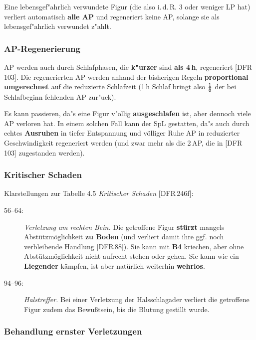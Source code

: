 \documentclass[10pt,a4paper,germanpar]{article}
\begin{document}
Eine lebensgef"ahrlich verwundete Figur (die also i.\,d.\,R. 3 oder
weniger LP hat) verliert automatisch \textbf{alle AP} und regeneriert
keine AP, solange sie als lebensgef"ahrlich verwundet z"ahlt.

\subsubsection{AP-Regenerierung}

AP werden auch durch Schlafphasen, die \textbf{k"urzer} sind
\textbf{als 4\,h}, regeneriert [DFR\,103]. Die regenerierten AP werden
anhand der bisherigen Regeln \textbf{proportional umgerechnet} auf die
reduzierte Schlafzeit (1\,h Schlaf bringt also $\frac{\sf 1}{\sf 8}$
der bei Schlafbeginn fehlenden AP zur"uck).

Es kann passieren, da"s eine Figur v"ollig \textbf{ausgeschlafen} ist,
aber dennoch viele AP verloren hat. In einem solchen Fall kann der
SpL gestatten, da"s auch durch echtes \textbf{Ausruhen} in
tiefer Entspannung und völliger Ruhe AP in reduzierter Geschwindigkeit
regeneriert werden (und zwar mehr als die 2\,AP, die in [DFR\,103]
zugestanden werden).

\subsubsection{Kritischer Schaden}

Klarstellungen zur Tabelle 4.5 \emph{Kritischer Schaden} [DFR\,246f]:

\begin{description}
\item[56--64:] \emph{Verletzung am rechten Bein.} Die getroffene Figur
  \textbf{stürzt} mangels Abstützmöglichkeit \textbf{zu Boden} (und
  verliert damit ihre ggf. noch verbleibende Handlung [DFR\,88]). Sie
  kann mit \textbf{B4} kriechen, aber ohne Abstützmöglichkeit nicht
  aufrecht stehen oder gehen. Sie kann wie ein \textbf{Liegender}
  kämpfen, ist aber natürlich weiterhin \textbf{wehrlos}.
\item[94--96:] \emph{Halstreffer.} Bei einer Verletzung der
  Halsschlagader verliert die getroffene Figur zudem das Bewußtsein,
  bis die Blutung gestillt wurde.
\end{description}

\subsubsection{Behandlung ernster Verletzungen}
\end{document}
